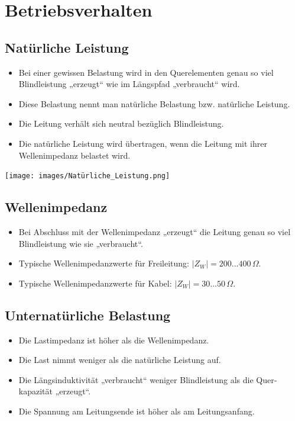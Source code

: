 \newcolumn
\section{Betriebsverhalten}


\subsection{Natürliche Leistung}

\begin{itemize}
    \item Bei einer gewissen Belastung wird in den Querelementen genau so viel Blindleistung „erzeugt“ wie im Längspfad „verbraucht“ wird.
    \item Diese Belastung nennt man natürliche Belastung bzw. natürliche Leistung.
    \item Die Leitung verhält sich neutral bezüglich Blindleistung.
    \item Die natürliche Leistung wird übertragen, wenn die Leitung mit ihrer Wellenimpedanz belastet wird.
\end{itemize}

\vspace{0.15cm}

\texttt{[image: images/Natürliche\_Leistung.png]}


\subsection{Wellenimpedanz}

\begin{itemize}
    \item Bei Abschluss mit der Wellenimpedanz „erzeugt“ die Leitung genau so viel Blindleistung wie sie „verbraucht“.
    \item Typische Wellenimpedanzwerte für Freileitung: \( |\!Z_W\!| = 200 \ldots 400\,\Omega \).
    \item Typische Wellenimpedanzwerte für Kabel: \( |\!Z_W\!| = 30 \ldots 50\,\Omega \).
\end{itemize}


\subsection{Unternatürliche Belastung}

\begin{itemize}
    \item Die Lastimpedanz ist höher als die Wellenimpedanz.
    \item Die Last nimmt weniger als die natürliche Leistung auf.
    \item Die Längsinduktivität „verbraucht“ weniger Blindleistung als die Quer­kapazität „erzeugt“.
    \item Die Spannung am Leitungsende ist höher als am Leitungsanfang.
\end{itemize}


